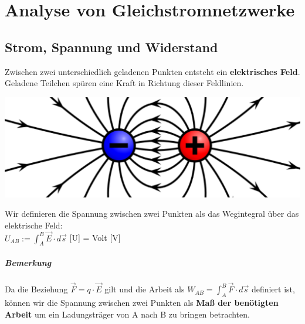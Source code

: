 %
%
%
%
%

					\section{Analyse von Gleichstromnetzwerke}
					\label{chap:Style}


					\subsection{Strom, Spannung und Widerstand}


					Zwischen zwei unterschiedlich geladenen Punkten entsteht ein \textbf{elektrisches Feld}. Geladene Teilchen spüren eine Kraft in Richtung dieser Feldlinien. \\

					\begin{center}
						\includegraphics[scale=0.2]{img/e-feld.png}
					\end{center}



           \beginip
						Wir definieren die Spannung zwischen zwei Punkten als das Wegintegral über das elektrische Feld: \\
						\formulaBegin
						$ U_{AB} :=  \int_A^B \vec{E} \cdot d\vec{s} $
						{[U]} = Volt {[V]}
						\formulaEnd
          \iend

					\subparagraph{Bemerkung}

					\begin{addmargin}[1em]{0cm}
						\vspace{-2mm}
						Da die Beziehung $\vec{F} =  q \cdot \vec{E} $ gilt und die Arbeit als $ W_{AB} = \int_A^B \vec{F} \cdot d\vec{s}$ definiert ist, können wir die Spannung zwischen zwei Punkten als \textbf{Maß der benötigten Arbeit} um ein Ladungsträger von A nach B zu bringen betrachten.
					\end{addmargin}


